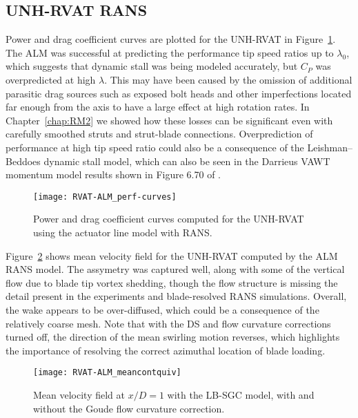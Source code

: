 \subsection{UNH-RVAT RANS}

Power and drag coefficient curves are plotted for the UNH-RVAT in
Figure~\ref{fig:RVAT-ALM-perf-curves}. The ALM was successful at predicting the
performance tip speed ratios up to $\lambda_0$, which suggests that dynamic
stall was being modeled accurately, but $C_P$ was overpredicted at high
$\lambda$. This may have been caused by the omission of additional parasitic
drag sources such as exposed bolt heads and other imperfections located far
enough from the axis to have a large effect at high rotation rates. In
Chapter~\ref{chap:RM2} we showed how these losses can be significant even with
carefully smoothed struts and strut-blade connections. Overprediction of
performance at high tip speed ratio could also be a consequence of the
Leishman--Beddoes dynamic stall model, which can also be seen in the Darrieus
VAWT momentum model results shown in Figure 6.70 of \cite{Para2002}.

\begin{figure}
    \centering
    
    \texttt{[image: RVAT-ALM\_perf-curves]}
    
    \caption{Power and drag coefficient curves computed for the UNH-RVAT using
        the actuator line model with RANS.}
    
    \label{fig:RVAT-ALM-perf-curves}
\end{figure}

Figure~\ref{fig:RVAT-ALM-meancontquiv} shows mean velocity field for the
UNH-RVAT computed by the ALM RANS model. The assymetry was captured well, along
with some of the vertical flow due to blade tip vortex shedding, though the flow
structure is missing the detail present in the experiments and blade-resolved
RANS simulations. Overall, the wake appears to be over-diffused, which could be
a consequence of the relatively coarse mesh. Note that with the DS and flow
curvature corrections turned off, the direction of the mean swirling motion
reverses, which highlights the importance of resolving the correct azimuthal
location of blade loading.

\begin{figure}
    \centering

    \texttt{[image: RVAT-ALM\_meancontquiv]}
    
    \caption{Mean velocity field at $x/D=1$ with the LB-SGC model, with and
        without the Goude flow curvature correction.}
    
    \label{fig:RVAT-ALM-meancontquiv}
\end{figure}

